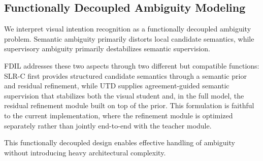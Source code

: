 \subsection{Functionally Decoupled Ambiguity Modeling}

We interpret visual intention recognition as a functionally decoupled ambiguity problem. Semantic ambiguity primarily distorts local candidate semantics, while supervisory ambiguity primarily destabilizes semantic supervision.

FDIL addresses these two aspects through two different but compatible functions: SLR-C first provides structured candidate semantics through a semantic prior and residual refinement, while UTD supplies agreement-guided semantic supervision that stabilizes both the visual student and, in the full model, the residual refinement module built on top of the prior. This formulation is faithful to the current implementation, where the refinement module is optimized separately rather than jointly end-to-end with the teacher module.

This functionally decoupled design enables effective handling of ambiguity without introducing heavy architectural complexity.
